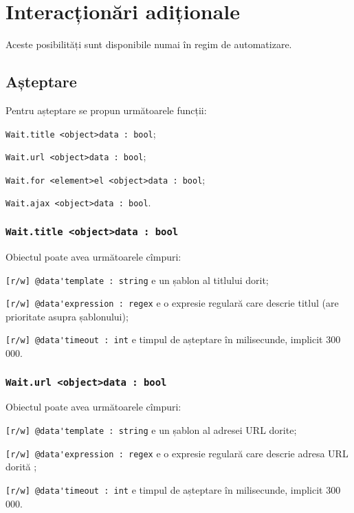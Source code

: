\section{Interacționări adiționale}

Aceste posibilități sunt disponibile numai în regim de automatizare.

\subsection{Așteptare}

Pentru așteptare se propun următoarele funcții:
\begin{icItems}
	\item \lstinline|Wait.title <object>data : bool|;
	\item \lstinline|Wait.url <object>data : bool|;
	\item \lstinline|Wait.for <element>el <object>data : bool|;
	\item \lstinline|Wait.ajax <object>data : bool|.
\end{icItems}

\subsubsection{\lstinline|Wait.title <object>data : bool|}

Obiectul  poate avea următoarele cîmpuri:
\begin{icItems}
	\item \lstinline|[r/w] @data'template : string| e un șablon al titlului dorit;
	\item \lstinline|[r/w] @data'expression : regex| e o expresie regulară care descrie titlul (are prioritate asupra șablonului);
	\item \lstinline|[r/w] @data'timeout : int| e timpul de așteptare în milisecunde, implicit 300 000.
\end{icItems}

\subsubsection{\lstinline|Wait.url <object>data : bool|}

Obiectul  poate avea următoarele cîmpuri:
\begin{icItems}
	\item \lstinline|[r/w] @data'template : string| e un șablon al adresei URL dorite;
	\item \lstinline|[r/w] @data'expression : regex| e o expresie regulară care descrie adresa URL dorită ;
	\item \lstinline|[r/w] @data'timeout : int| e timpul de așteptare în milisecunde, implicit 300 000.
\end{icItems}

